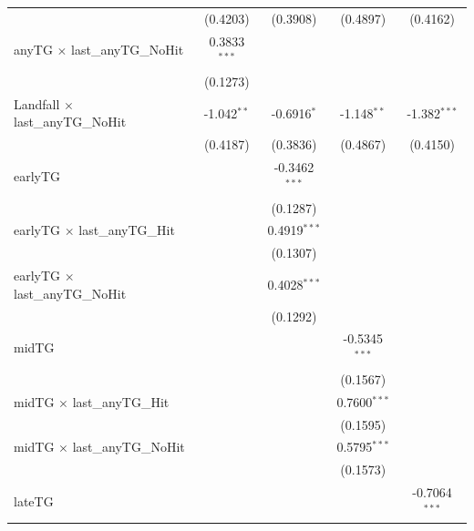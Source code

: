 \documentclass{article}
\begin{document}
\begin{appendices}
\begin{table}[htbp]
\begin{tabular}{lcccc}
                                              & (0.4203)        & (0.3908)        & (0.4897)        & (0.4162)\\   
      anyTG $\times$ last\_anyTG\_NoHit       & 0.3833$^{***}$  &                 &                 &   \\   
                                              & (0.1273)        &                 &                 &   \\   
      Landfall $\times$ last\_anyTG\_NoHit    & -1.042$^{**}$   & -0.6916$^{*}$   & -1.148$^{**}$   & -1.382$^{***}$\\   
                                              & (0.4187)        & (0.3836)        & (0.4867)        & (0.4150)\\   
      earlyTG                                 &                 & -0.3462$^{***}$ &                 &   \\   
                                              &                 & (0.1287)        &                 &   \\   
      earlyTG $\times$ last\_anyTG\_Hit       &                 & 0.4919$^{***}$  &                 &   \\   
                                              &                 & (0.1307)        &                 &   \\   
      earlyTG $\times$ last\_anyTG\_NoHit     &                 & 0.4028$^{***}$  &                 &   \\   
                                              &                 & (0.1292)        &                 &   \\   
      midTG                                   &                 &                 & -0.5345$^{***}$ &   \\   
                                              &                 &                 & (0.1567)        &   \\   
      midTG $\times$ last\_anyTG\_Hit         &                 &                 & 0.7600$^{***}$  &   \\   
                                              &                 &                 & (0.1595)        &   \\   
      midTG $\times$ last\_anyTG\_NoHit       &                 &                 & 0.5795$^{***}$  &   \\   
                                              &                 &                 & (0.1573)        &   \\   
      lateTG                                  &                 &                 &                 & -0.7064$^{***}$\\   

\end{tabular}
\end{table}
\end{appendices}
\end{document}
